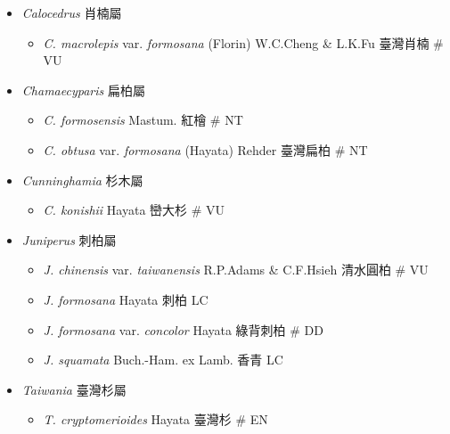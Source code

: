 
  \begin{itemize}
 \item[] \textit{Calocedrus} 肖楠屬
                            
  \begin{itemize}
        \item[] \textit{C. macrolepis} var. \textit{formosana} (Florin) W.C.Cheng \& L.K.Fu 
                                    臺灣肖楠  \# VU
  \end{itemize}
 \item[] \textit{Chamaecyparis} 扁柏屬
                            
  \begin{itemize}
        \item[] \textit{C. formosensis} Mastum.  紅檜  \# NT
        \item[] \textit{C. obtusa} var. \textit{formosana} (Hayata) Rehder 
                                    臺灣扁柏  \# NT
  \end{itemize}
 \item[] \textit{Cunninghamia} 杉木屬
                            
  \begin{itemize}
        \item[] \textit{C. konishii} Hayata  巒大杉  \# VU
  \end{itemize}
 \item[] \textit{Juniperus} 刺柏屬
                            
  \begin{itemize}
        \item[] \textit{J. chinensis} var. \textit{taiwanensis} R.P.Adams \& C.F.Hsieh 
                                    清水圓柏  \# VU
        \item[] \textit{J. formosana} Hayata  刺柏   LC
        \item[] \textit{J. formosana} var. \textit{concolor} Hayata 
                                    綠背刺柏  \# DD
        \item[] \textit{J. squamata} Buch.-Ham. ex Lamb.  香青   LC
  \end{itemize}
 \item[] \textit{Taiwania} 臺灣杉屬
                            
  \begin{itemize}
        \item[] \textit{T. cryptomerioides} Hayata  臺灣杉  \# EN
  \end{itemize}
  \end{itemize}
